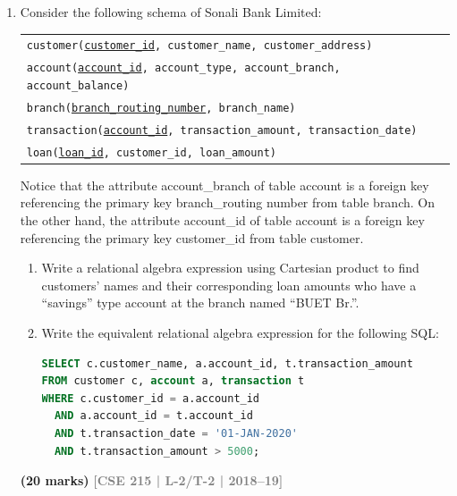 \documentclass[12pt,a3paper]{article}
\newcommand{\yr}[1]{\hfill\textcolor{gray}{\small\textbf{[#1]}}}
\newcommand{\mk}[1]{\textcolor{orange!70!black}{\small\textbf{(#1 marks)}}}
\begin{document}
\begin{enumerate}
\item Consider the following schema of Sonali Bank Limited:
\begin{center}
\begin{tabular}{l}
\texttt{customer(\underline{customer\_id}, customer\_name, customer\_address)}\\
\texttt{account(\underline{account\_id}, account\_type, account\_branch, account\_balance)}\\
\texttt{branch(\underline{branch\_routing\_number}, branch\_name)}\\
\texttt{transaction(\underline{account\_id}, transaction\_amount, transaction\_date)}\\
\texttt{loan(\underline{loan\_id}, customer\_id, loan\_amount)}
\end{tabular}
\end{center}
Notice that the attribute account_branch of table account is a foreign key referencing
the primary key branch_routing number from table branch. On the other hand,
the attribute account_id of table account is a foreign key referencing the primary key
customer_id from table customer.
\begin{enumerate}
  \item Write a relational algebra expression using Cartesian product to find customers' names and their corresponding loan amounts who have a ``savings'' type account at the branch named ``BUET Br.''.
  \item Write the equivalent relational algebra expression for the following SQL:
\begin{lstlisting}[language=SQL]
SELECT c.customer_name, a.account_id, t.transaction_amount
FROM customer c, account a, transaction t
WHERE c.customer_id = a.account_id
  AND a.account_id = t.account_id
  AND t.transaction_date = '01-JAN-2020'
  AND t.transaction_amount > 5000;
\end{lstlisting}
\end{enumerate}
\mk{20} \yr{CSE 215 | L-2/T-2 | 2018--19}


\end{enumerate}
\end{document}
